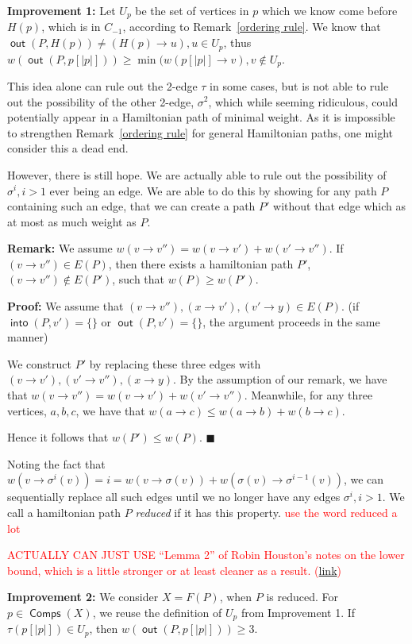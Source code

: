 \documentclass{article}
\theoremstyle{definition}
\DeclareMathOperator{\out}{\bm{\mathsf{out}}}
\DeclareMathOperator{\into}{\bm{\mathsf{into}}}
\DeclareMathOperator{\Comp}{\bm{\mathsf{Comps}}}
\newcommand{\edit}[1]{\textcolor{red}{#1}}
\begin{document}
\textbf{Improvement 1:} \label{rough} Let $U_p$ be the set of vertices in $p$ which we know come before $H(p)$, which is in $C_{-1}$, according to Remark~\ref{ordering rule}. We know that $\out(P,H(p)) \neq (H(p) \to u), u \in U_p$, thus $w(\out(P,p[|p|])) \geq \min(w(p[|p|] \to v), v\not \in U_p$. 

This idea alone can rule out the 2-edge $\tau$ in some cases, but is not able to rule out the possibility of the other 2-edge, $\sigma^2$, which while seeming ridiculous, could potentially appear in a Hamiltonian path of minimal weight. As it is impossible to strengthen Remark~\ref{ordering rule} for general Hamiltonian paths, one might consider this a dead end.

However, there is still hope. We are actually able to rule out the possibility of $\sigma^i, i > 1$ ever being an edge. We are able to do this by showing for any path $P$ containing such an edge, that we can create a path $P'$ without that edge which as at most as much weight as $P$.

\textbf{Remark:} We assume $w(v \to v'') = w(v \to v') + w(v' \to v'')$. If $(v\to v'') \in E(P)$, then there exists a hamiltonian path $P'$, $(v \to v'') \not \in E(P')$, such that $w(P) \geq w(P')$.

\textbf{Proof:} We assume that $(v \to v''), (x \to v'), (v' \to y) \in E(P)$. (if $\into(P,v') =\{\}$ or $\out(P,v') = \{\}$, the argument proceeds in the same manner)

We construct $P'$ by replacing these three edges with $(v \to v'),(v'\to v''), (x \to y)$. By the assumption of our remark, we have that $w(v\to v'') = w(v \to v') + w(v' \to v'')$. Meanwhile, for any three vertices, $a,b,c$, we have that $w(a\to c) \leq w(a\to b) + w(b\to c)$.

Hence it follows that $w(P') \leq w(P)$. $\blacksquare$

Noting the fact that $w(v \to \sigma^i(v)) = i = w(v \to \sigma(v)) + w(\sigma(v)\to \sigma^{i-1}(v))$, we can sequentially replace all such edges until we no longer have any edges $\sigma^i, i > 1$. We call a hamiltonian path $P$ \textit{reduced} if it has this property.\edit{ use the word reduced a lot}

\edit{ACTUALLY CAN JUST USE ``Lemma 2'' of Robin Houston's notes on the lower bound, which is a little stronger or at least cleaner as a result. (\href{https://github.com/superpermutators/superperm/blob/master/lower-bound-notes/lower-bound-notes.pdf}{link})}

\textbf{Improvement 2:} \label{refined} We consider $X = F(P)$, when $P$ is reduced. For $p \in \Comp(X)$, we reuse the definition of $U_p$ from Improvement 1. If $\tau(p[|p|]) \in U_p$, then $w(\out(P,p[|p|])) \geq 3$.
\end{document}
